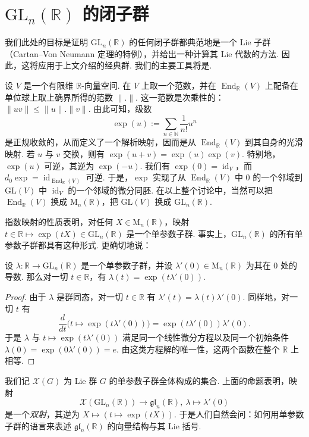 \section{$\mathrm{GL}_n(\mathbb R)$ 的闭子群}\label{sec:lie-1-6}
我们此处的目标是证明 $\mathrm{GL}_n(\mathbb R)$ 的任何闭子群都典范地是一个 Lie 子群（Cartan--Von Neumann 定理的特例），并给出一种计算其 Lie 代数的方法. 因此，这将应用于上文介绍的经典群. 我们的主要工具将是.
\begin{numpara}[指数映射]\label{np:lie-1-6-1}
设 $V$ 是一个有限维 $\mathbb R$-向量空间. 在 $V$ 上取一个范数，并在 $\operatorname{End}_{\mathbb R}(V)$ 上配备在单位球上取上确界所得的范数 $\|.\|$. 这一范数是次乘性的：$\|uv\|\leqslant\|u\|.\|v\|$. 由此可知，级数
\[
\exp(u):=\sum_{n\in\mathbb N}\frac{1}{n!}u^n
\]
是正规收敛的，从而定义了一个解析映射，因而是从 $\operatorname{End}_{\mathbb R}(V)$ 到其自身的光滑映射. 若 $u$ 与 $v$ 交换，则有 $\exp(u+v)=\exp(u)\exp(v)$. 特别地，$\exp(u)$ 可逆，其逆为 $\exp(-u)$. 我们有 $\exp(0)=\operatorname{id}_V$，而 $d_0\exp=\operatorname{id}_{\operatorname{End}_{\mathbb R}(V)}$ 可逆. 于是，$\exp$ 实现了从 $\operatorname{End}_{\mathbb R}(V)$ 中 $0$ 的一个邻域到 $\mathrm{GL}(V)$ 中 $\operatorname{id}_V$ 的一个邻域的微分同胚.
在以上整个讨论中，当然可以把 $\operatorname{End}_{\mathbb R}(V)$ 换成 $\mathrm{M}_n(\mathbb R)$，把 $\mathrm{GL}(V)$ 换成 $\mathrm{GL}_n(\mathbb R)$.
\end{numpara}
\begin{numpara}\label{np:lie-1-6-2}
指数映射的性质表明，对任何 $X\in\mathrm{M}_n(\mathbb R)$，映射 $t\in\mathbb R\mapsto\exp(tX)\in\mathrm{GL}_n(\mathbb R)$ 是一个单参数子群. 事实上，$\mathrm{GL}_n(\mathbb R)$ 的所有单参数子群都具有这种形式. 更确切地说：
\begin{proposition*}
设 $\lambda:\mathbb R\longrightarrow\mathrm{GL}_n(\mathbb R)$ 是一个单参数子群，并设 $\lambda'(0)\in\mathrm{M}_n(\mathbb R)$ 为其在 $0$ 处的导数. 那么对一切 $t\in\mathbb R$，有 $\lambda(t)=\exp(t\lambda'(0))$.
\end{proposition*}
\begin{proof}
由于 $\lambda$ 是群同态，对一切 $t\in\mathbb R$ 有 $\lambda'(t)=\lambda(t)\lambda'(0)$. 同样地，对一切 $t$ 有
\[
\frac{d}{dt}\bigl(t\mapsto\exp(t\lambda'(0))\bigr)=\exp(t\lambda'(0))\lambda'(0).
\]
于是 $\lambda$ 与 $t\mapsto\exp(t\lambda'(0))$ 满足同一个线性微分方程以及同一个初始条件 $\lambda(0)=\exp(0\lambda'(0))=e$. 由这类方程解的唯一性，这两个函数在整个 $\mathbb R$ 上相等.
\end{proof}
我们记 $\mathscr X(G)$ 为 Lie 群 $G$ 的单参数子群全体构成的集合. 上面的命题表明，映射
\[
\mathscr X(\mathrm{GL}_n(\mathbb R))\longrightarrow\mathfrak{gl}_n(\mathbb R),\ \lambda\mapsto\lambda'(0)
\]
是一个\emph{双射}，其逆为 $X\mapsto(t\mapsto\exp(tX))$. 于是人们自然会问：如何用单参数子群的语言来表述 $\mathfrak{gl}_n(\mathbb R)$ 的向量结构与其 Lie 括号.
\end{numpara}
